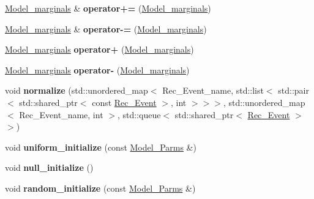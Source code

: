\begin{DoxyCompactItemize}
\item 
\mbox{\label{classModel__marginals_a2dd9431c456a5f3d74b3882cb0754daf}} 
\hyperlink{classModel__marginals}{Model\+\_\+marginals} \& {\bfseries operator+=} (\hyperlink{classModel__marginals}{Model\+\_\+marginals})
\item 
\mbox{\label{classModel__marginals_aff98fb8317f93d4cac83b1c0e95139dd}} 
\hyperlink{classModel__marginals}{Model\+\_\+marginals} \& {\bfseries operator-\/=} (\hyperlink{classModel__marginals}{Model\+\_\+marginals})
\item 
\mbox{\label{classModel__marginals_a349fc9203c44d78b412128f182edf3be}} 
\hyperlink{classModel__marginals}{Model\+\_\+marginals} {\bfseries operator+} (\hyperlink{classModel__marginals}{Model\+\_\+marginals})
\item 
\mbox{\label{classModel__marginals_aa5f6720c88c804180bfcd3e433efb7ad}} 
\hyperlink{classModel__marginals}{Model\+\_\+marginals} {\bfseries operator-\/} (\hyperlink{classModel__marginals}{Model\+\_\+marginals})
\item 
\mbox{\label{classModel__marginals_afcfcba336f58b08e37074556b82650e8}} 
void {\bfseries normalize} (std\+::unordered\+\_\+map$<$ Rec\+\_\+\+Event\+\_\+name, std\+::list$<$ std\+::pair$<$ std\+::shared\+\_\+ptr$<$ const \hyperlink{classRec__Event}{Rec\+\_\+\+Event} $>$, int $>$$>$$>$, std\+::unordered\+\_\+map$<$ Rec\+\_\+\+Event\+\_\+name, int $>$, std\+::queue$<$ std\+::shared\+\_\+ptr$<$ \hyperlink{classRec__Event}{Rec\+\_\+\+Event} $>$$>$)
\item 
\mbox{\label{classModel__marginals_a2481b2c5512f11270c0e551a7acbaaea}} 
void {\bfseries uniform\+\_\+initialize} (const \hyperlink{classModel__Parms}{Model\+\_\+\+Parms} \&)
\item 
\mbox{\label{classModel__marginals_aaa03a2e34510c9287522f97cd8bf8fd5}} 
void {\bfseries null\+\_\+initialize} ()
\item 
\mbox{\label{classModel__marginals_a5256654ecde63273624344f5d97b4b66}} 
void {\bfseries random\+\_\+initialize} (const \hyperlink{classModel__Parms}{Model\+\_\+\+Parms} \&)
$$
\end{DoxyCompactItemize}
